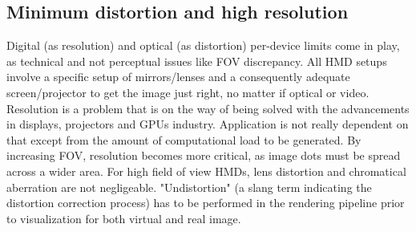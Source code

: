 \subsection{Minimum distortion and high resolution}
Digital (as resolution) and optical (as distortion) per-device limits come in play, as technical and not perceptual issues like FOV discrepancy. All HMD setups involve a specific setup of mirrors/lenses and a consequently adequate screen/projector to get the image just right, no matter if optical or video. Resolution is a problem that is on the way of being solved with the advancements in displays, projectors and GPUs industry. Application is not really dependent on that except from the amount of computational load to be generated. By increasing FOV, resolution becomes more critical, as image dots must be spread across a wider area.
For high field of view HMDs, lens distortion and chromatical aberration are not negligeable. "Undistortion" (a slang term indicating the distortion correction process) has to be performed in the rendering pipeline prior to visualization for both virtual and real image.

